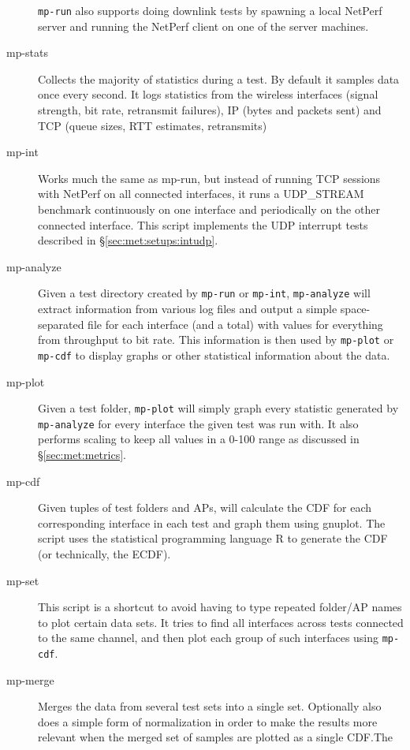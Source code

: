 \begin{description}
    \texttt{mp-run} also supports doing downlink tests by spawning a local
    NetPerf server and running the NetPerf client on one of the server machines.
  \item[mp-stats]
    Collects the majority of statistics during a test. By default it samples
    data once every second. It logs statistics from the wireless interfaces
    (signal strength, bit rate, retransmit failures), IP (bytes and packets
    sent) and TCP (queue sizes, RTT estimates, retransmits)
  \item[mp-int]
    Works much the same as mp-run, but instead of running TCP sessions with
    NetPerf on all connected interfaces, it runs a UDP\_STREAM benchmark
    continuously on one interface and periodically on the other connected
    interface. This script implements the UDP interrupt tests described in
    \S\ref{sec:met:setups:intudp}.
  \item[mp-analyze]
    Given a test directory created by \texttt{mp-run} or \texttt{mp-int},
    \texttt{mp-analyze} will extract information from various log files and
    output a simple space-separated file for each interface (and a total) with
    values for everything from throughput to bit rate. This information is then
    used by \texttt{mp-plot} or \texttt{mp-cdf} to display graphs or other
    statistical information about the data.
  \item[mp-plot]
    Given a test folder, \texttt{mp-plot} will simply graph every statistic
    generated by \texttt{mp-analyze} for every interface the given test was run
    with. It also performs scaling to keep all values in a 0-100 range as
    discussed in \S\ref{sec:met:metrics}.
  \item[mp-cdf]
    Given tuples of test folders and APs, will calculate the CDF for each
    corresponding interface in each test and graph them using gnuplot. The
    script uses the statistical programming language R to generate the CDF (or
    technically, the ECDF).
  \item[mp-set]
    This script is a shortcut to avoid having to type repeated folder/AP names
    to plot certain data sets. It tries to find all interfaces across tests
    connected to the same channel, and then plot each group of such interfaces
    using \texttt{mp-cdf}.
  \item[mp-merge]
    Merges the data from several test sets into a single set. Optionally also
    does a simple form of normalization in order to make the results more
    relevant when the merged set of samples are plotted as a single CDF.\@ The

\end{description}
